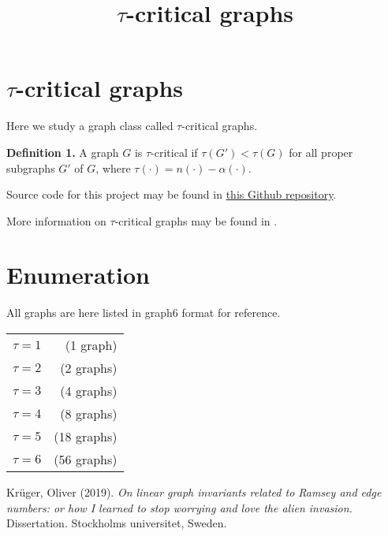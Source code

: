 \documentclass{article}
\title{$\tau$-critical graphs}
\begin{document}
\section{$\tau$-critical graphs}

Here we study a graph class called $\tau$-critical graphs.

{\bf Definition 1.} A graph $G$ is $\tau$-critical if $\tau(G') < \tau(G)$ for all proper subgraphs $G'$ of $G$, where $\tau(\cdot) = n(\cdot) - \alpha(\cdot)$.

Source code for this project may be found in \href{https://github.com/tbk1988/taucritical}{this Github repository}.

More information on $\tau$-critical graphs may be found in
\cite{thesis}.

\section{Enumeration}

All graphs are here listed in graph6 format for reference.

\begin{tabular}{lr}
  \href{taucrit_1.txt}{$\tau = 1$} & (1 graph) \\
  \href{taucrit_2.txt}{$\tau = 2$} & (2 graphs) \\
  \href{taucrit_3.txt}{$\tau = 3$} & (4 graphs) \\
  \href{taucrit_4.txt}{$\tau = 4$} & (8 graphs) \\
  \href{taucrit_5.txt}{$\tau = 5$} & (18 graphs) \\
  \href{taucrit_6.txt}{$\tau = 6$} & (56 graphs)
\end{tabular}

\begin{thebibliography}{9}
   Kr\"uger, Oliver (2019). \emph{On linear graph invariants related to Ramsey and edge numbers: or how I learned to stop worrying and love the alien invasion.} Dissertation. Stockholms universitet, Sweden.
\end{thebibliography}
\end{document}
